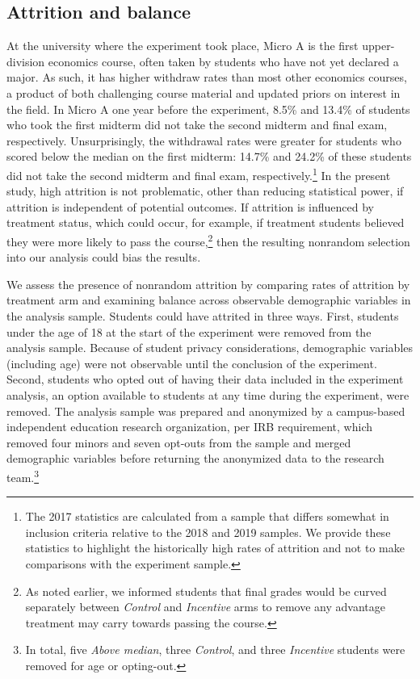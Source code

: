 \documentclass[12pt]{article}
\begin{document}
\subsection{Attrition and balance} \label{attrition}

At the university where the experiment took place, Micro A is the first upper-division economics course, often taken by students who have not yet declared a major. As such, it has higher withdraw rates than most other economics courses, a product of both challenging course material and updated priors on interest in the field. In Micro A one year before the experiment, 8.5\% and 13.4\% of students who took the first midterm did not take the second midterm and final exam, respectively. Unsurprisingly, the withdrawal rates were greater for students who scored below the median on the first midterm: 14.7\% and 24.2\% of these students did not take the second midterm and final exam, respectively.\footnote{The 2017 statistics are calculated from a sample that differs somewhat in inclusion criteria relative to the 2018 and 2019 samples. We provide these statistics to highlight the historically high rates of attrition and not to make comparisons with the experiment sample.} In the present study, high attrition is not problematic, other than reducing statistical power, if attrition is independent of potential outcomes. If attrition is influenced by treatment status, which could occur, for example, if treatment students believed they were more likely to pass the course,\footnote{As noted earlier, we informed students that final grades would be curved separately between \textit{Control} and \textit{Incentive} arms to remove any advantage treatment may carry towards passing the course.} then the resulting nonrandom selection into our analysis could bias the results.

We assess the presence of nonrandom attrition by comparing rates of attrition by treatment arm and examining balance across observable demographic variables in the analysis sample. Students could have attrited in three ways. First, students under the age of 18 at the start of the experiment were removed from the analysis sample. Because of student privacy considerations, demographic variables (including age) were not observable until the conclusion of the experiment. Second, students who opted out of having their data included in the experiment analysis, an option available to students at any time during the experiment, were removed. The analysis sample was prepared and anonymized by a campus-based independent education research organization, per IRB requirement, which removed four minors and seven opt-outs from the sample and merged demographic variables before returning the anonymized data to the research team.\footnote{In total, five \textit{Above median}, three \textit{Control}, and three \textit{Incentive} students were removed for age or opting-out.}
\end{document}

